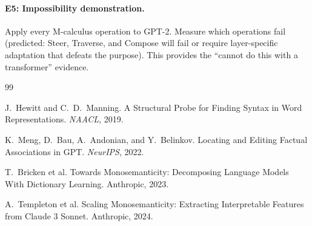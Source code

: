 \documentclass[11pt, a4paper]{article}
\theoremstyle{plain}
\theoremstyle{definition}
\theoremstyle{remark}
\begin{document}
\paragraph{E5: Impossibility demonstration.}
Apply every M-calculus operation to GPT-2.
Measure which operations fail (predicted: Steer, Traverse, and Compose will fail or require layer-specific adaptation that defeats the purpose).
This provides the ``cannot do this with a transformer'' evidence.

\begin{thebibliography}{99}

J.~Hewitt and C.~D.~Manning.
\newblock A Structural Probe for Finding Syntax in Word Representations.
\newblock \emph{NAACL}, 2019.

K.~Meng, D.~Bau, A.~Andonian, and Y.~Belinkov.
\newblock Locating and Editing Factual Associations in GPT.
\newblock \emph{NeurIPS}, 2022.

T.~Bricken et al.
\newblock Towards Monosemanticity: Decomposing Language Models With Dictionary Learning.
\newblock Anthropic, 2023.

A.~Templeton et al.
\newblock Scaling Monosemanticity: Extracting Interpretable Features from Claude 3 Sonnet.
\newblock Anthropic, 2024.

\end{thebibliography}
\end{document}
